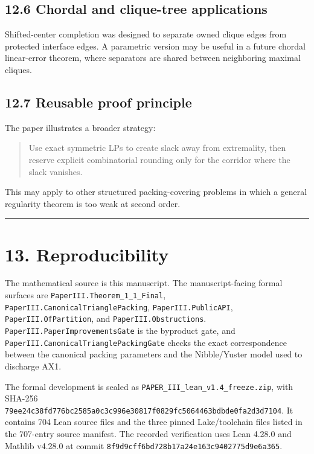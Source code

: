 \documentclass[
  american,
  11pt,
  a4paper,
]{article}
\begin{document}
\subsection{12.6 Chordal and clique-tree applications}\label{chordal-and-clique-tree-applications}

Shifted-center completion was designed to separate owned clique edges from protected interface edges. A parametric version may be useful in a future chordal linear-error theorem, where separators are shared between neighboring maximal cliques.

\subsection{12.7 Reusable proof principle}\label{reusable-proof-principle}

The paper illustrates a broader strategy:

\begin{quote}
Use exact symmetric LPs to create slack away from extremality, then reserve explicit combinatorial rounding only for the corridor where the slack vanishes.
\end{quote}

This may apply to other structured packing-covering problems in which a general regularity theorem is too weak at second order.

\begin{center}\rule{0.5\linewidth}{0.5pt}\end{center}

\section{13. Reproducibility}\label{reproducibility}

The mathematical source is this manuscript. The manuscript-facing formal surfaces are \texttt{PaperIII.Theorem\_1\_1\_Final}, \texttt{PaperIII.CanonicalTrianglePacking}, \texttt{PaperIII.PublicAPI}, \texttt{PaperIII.OfPartition}, and \texttt{PaperIII.Obstructions}. \texttt{PaperIII.PaperImprovementsGate} is the byproduct gate, and \texttt{PaperIII.CanonicalTrianglePacking\allowbreak{}Gate} checks the exact correspondence between the canonical packing parameters and the Nibble/Yuster model used to discharge AX1.

The formal development is sealed as \texttt{PAPER\_III\_lean\_v1.4\_freeze.zip}, with SHA-256 \texttt{79ee24c38fd776bc2585a0c3c996e30817f0829fc5064463bdbde0fa2d3d7104}. It contains 704 Lean source files and the three pinned Lake/toolchain files listed in the 707-entry source manifest. The recorded verification uses Lean 4.28.0 and Mathlib v4.28.0 at commit \texttt{8f9d9cff6bd728b17a24e163c9402775d9e6a365}.
\end{document}
